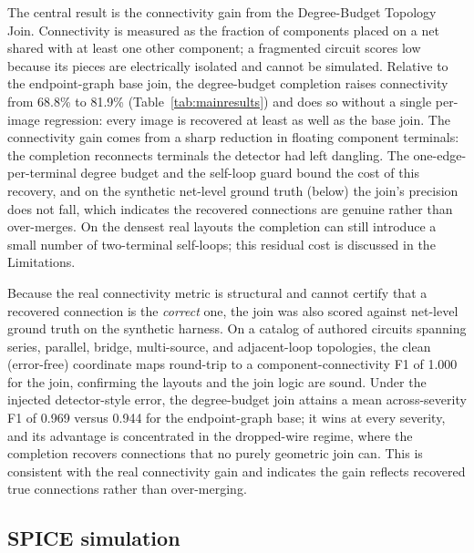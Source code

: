 The central result is the connectivity gain from the Degree-Budget Topology Join.
Connectivity is measured as the fraction of components placed on a net shared with
at least one other component; a fragmented circuit scores low because its pieces
are electrically isolated and cannot be simulated. Relative to the endpoint-graph
base join, the degree-budget completion raises connectivity from 68.8\% to 81.9\%
(Table~\ref{tab:mainresults}) and does so without a single per-image regression:
every image is recovered at least as well as the base join. The connectivity gain
comes from a sharp reduction in floating component terminals: the completion
reconnects terminals the detector had left dangling. The one-edge-per-terminal
degree budget and the self-loop guard bound the cost of this recovery, and on the
synthetic net-level ground truth (below) the join's precision does not fall, which
indicates the recovered connections are genuine rather than over-merges. On the
densest real layouts the completion can still introduce a small number of
two-terminal self-loops; this residual cost is discussed in the Limitations.

\begin{table}[H]
\centering
\caption{Topology-join comparison. Connectivity is the fraction of components on a multi-component net; self-loops count two-terminal parts shorted onto one net; regressions count images where connectivity falls below the base join.}

\label{tab:mainresults}
\end{table}

Because the real connectivity metric is structural and cannot certify that a
recovered connection is the \emph{correct} one, the join was also scored against
net-level ground truth on the synthetic harness. On a catalog of authored circuits
spanning series, parallel, bridge, multi-source, and adjacent-loop topologies, the
clean (error-free) coordinate maps round-trip to a component-connectivity F1 of
1.000 for the join, confirming the layouts and the join logic are sound. Under the
injected detector-style error, the degree-budget join attains a mean
across-severity F1 of 0.969 versus 0.944 for the endpoint-graph base; it wins at
every severity, and its advantage is concentrated in the dropped-wire regime,
where the completion recovers connections that no purely geometric join can. This
is consistent with the real connectivity gain and indicates the gain reflects
recovered true connections rather than over-merging.

\subsection*{SPICE simulation}

